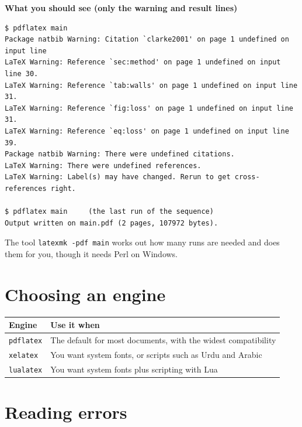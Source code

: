 \textbf{What you should see (only the warning and result lines)}

\begin{lstlisting}[language=text]
$ pdflatex main
Package natbib Warning: Citation `clarke2001' on page 1 undefined on input line
LaTeX Warning: Reference `sec:method' on page 1 undefined on input line 30.
LaTeX Warning: Reference `tab:walls' on page 1 undefined on input line 31.
LaTeX Warning: Reference `fig:loss' on page 1 undefined on input line 31.
LaTeX Warning: Reference `eq:loss' on page 1 undefined on input line 39.
Package natbib Warning: There were undefined citations.
LaTeX Warning: There were undefined references.
LaTeX Warning: Label(s) may have changed. Rerun to get cross-references right.

$ pdflatex main     (the last run of the sequence)
Output written on main.pdf (2 pages, 107972 bytes).
\end{lstlisting}

The tool \texttt{latexmk\ -pdf\ main} works out how many runs are needed and does them for you, though it needs Perl on Windows.

\section{Choosing an engine}\label{choosing-an-engine}

{\def\LTcaptype{none} %
\begin{longtable}[]{@{}
  >{\raggedright\arraybackslash}p{}
  >{\raggedright\arraybackslash}p{}@{}}
\toprule\noalign{}
\begin{minipage}[b]{\linewidth}\raggedright
Engine
\end{minipage} & \begin{minipage}[b]{\linewidth}\raggedright
Use it when
\end{minipage} \\
\midrule\noalign{}
\endhead
\bottomrule\noalign{}
\endlastfoot
\texttt{pdflatex} & The default for most documents, with the widest compatibility \\
\texttt{xelatex} & You want system fonts, or scripts such as Urdu and Arabic \\
\texttt{lualatex} & You want system fonts plus scripting with Lua \\
\end{longtable}
}

\section{Reading errors}\label{reading-errors}

